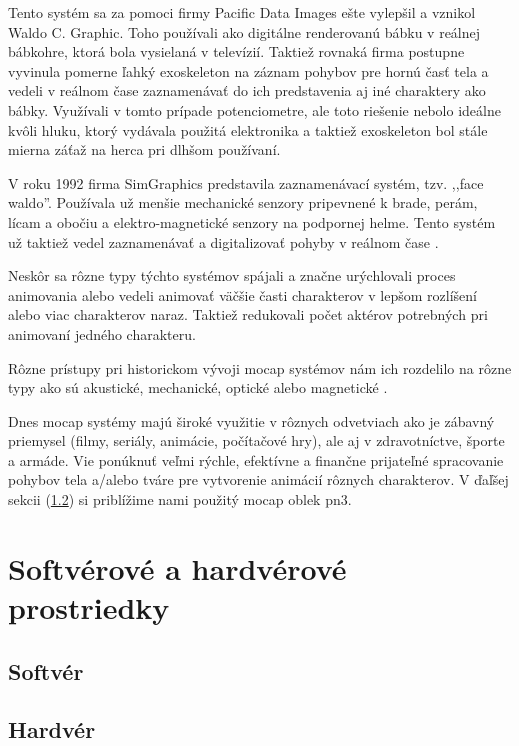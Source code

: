 Tento systém sa za pomoci firmy Pacific Data Images ešte vylepšil a vznikol Waldo C. Graphic. Toho používali ako digitálne renderovanú bábku v reálnej bábkohre, ktorá bola vysielaná v televízií. Taktiež rovnaká firma postupne vyvinula pomerne ľahký exoskeleton na záznam pohybov pre hornú časť tela a vedeli v reálnom čase zaznamenávať do ich predstavenia aj iné charaktery ako bábky. Využívali v tomto prípade potenciometre, ale toto riešenie nebolo ideálne kvôli hluku, ktorý vydávala použitá elektronika a taktiež exoskeleton bol stále mierna záťaž na herca pri dlhšom používaní.

V roku 1992 firma SimGraphics predstavila zaznamenávací systém, tzv. ,,face waldo''. Používala už menšie mechanické senzory pripevnené k brade, perám, lícam a obočiu a elektro-magnetické senzory na podpornej helme. Tento systém už taktiež vedel zaznamenávať a digitalizovať pohyby v reálnom čase \cite{mocapHistory}.

Neskôr sa rôzne typy týchto systémov spájali a značne urýchlovali proces animovania alebo vedeli animovať väčšie časti charakterov v lepšom rozlíšení alebo viac charakterov naraz. Taktiež redukovali počet aktérov potrebných pri animovaní jedného charakteru.

Rôzne prístupy pri historickom vývoji mocap systémov nám ich rozdelilo na rôzne typy ako sú akustické, mechanické, optické alebo magnetické \cite{mocapFundamentals}.

Dnes mocap systémy majú široké využitie v rôznych odvetviach ako je zábavný priemysel (filmy, seriály, animácie, počítačové hry), ale aj v zdravotníctve, športe a armáde. Vie ponúknuť veľmi rýchle, efektívne a finančne prijateľné spracovanie pohybov tela a/alebo tváre pre vytvorenie animácií rôznych charakterov. V ďaľšej sekcii (\ref{ssec:hw}) si priblížime nami použitý mocap oblek \acrfull{pn3}.

\section{Softvérové a hardvérové prostriedky}%
\subsection{Softvér}%

\subsection{Hardvér}%
\label{ssec:hw}

